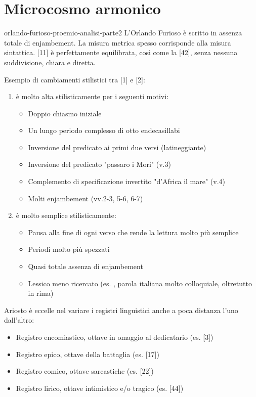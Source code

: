 \documentclass[preview]{standalone}
\begin{document}
\section{Microcosmo armonico}

\begin{snippet}{orlando-furioso-proemio-analisi-parte2}
    L'Orlando Furioso è scritto in assenza totale di enjambement.
    La misura metrica spesso corrisponde alla misura sintattica.
    [11] è perfettamente equilibrata, così come la [42], senza nessuna suddivisione, chiara e
    diretta.

    Esempio di cambiamenti stilistici tra [1] e [2]:
    \begin{enumerate}
        \item è molto alta stilisticamente per i seguenti motivi: \begin{itemize}
            \item Doppio chiasmo iniziale
            \item Un lungo periodo complesso di otto endecasillabi
            \item Inversione del predicato ai primi due versi (latineggiante)
            \item Inversione del predicato "passaro i Mori" (v.3)
            \item Complemento di specificazione invertito "d'Africa il mare" (v.4)
            \item Molti enjambement (vv.2-3, 5-6, 6-7)
        \end{itemize}
        \item è molto semplice stilisticamente: \begin{itemize}
            \item Pausa alla fine di ogni verso che rende la lettura molto più semplice
            \item Periodi molto più spezzati
            \item Quasi totale assenza di enjambement
            \item Lessico meno ricercato (es. , parola italiana molto colloquiale, oltretutto in rima)
        \end{itemize}
    \end{enumerate}

    Ariosto è eccelle nel variare i registri linguistici anche a poca distanza l'uno dall'altro:
    \begin{itemize}
        \item Registro encomiastico, ottave in omaggio al dedicatario (es. [3])
        \item Registro epico, ottave della battaglia (es. [17])
        \item Registro comico, ottave sarcastiche (es. [22])
        \item Registro lirico, ottave intimistico e/o tragico (es. [44])
    \end{itemize}
\end{snippet}
\end{document}
